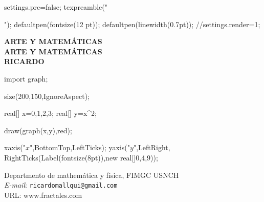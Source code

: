 \documentclass[12pt,a4paper]{book}
\begin{document}
\begin{asydef}
	settings.prc=false;
	texpreamble("\usepackage[lite,subscriptcorrection,slantedGreek,nofontinfo,amsbb,eucal]{mtpro2}");
	defaultpen(fontsize(12 pt));
	defaultpen(linewidth(0.7pt));
	//settings.render=1;
\end{asydef}
\thispagestyle{empty}
{
	\centering
	\vspace{3cm}
	\bf{\huge ARTE Y MATEMÁTICAS}\\
	\bf{\large ARTE Y MATEMÁTICAS}\\
	\vspace{0.5cm}
	\bf{RICARDO}\\
	\vspace{.5cm}

	\begin{asy}
	import graph;

size(200,150,IgnoreAspect);

real[] x={0,1,2,3};
real[] y=x^2;

draw(graph(x,y),red);

xaxis("$x$",BottomTop,LeftTicks);
yaxis("$y$",LeftRight,
      RightTicks(Label(fontsize(8pt)),new real[]{0,4,9}));
	\end{asy}
	\vfill
	Departmento de mathemática y física, FIMGC USNCH\\
	\emph{E-mail}: \texttt{ricardomallqui@gmail.com}\\
	URL: \textsf{www.fractales.com}

}
\newpage
\end{document}
